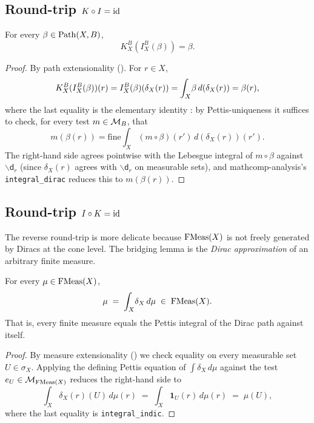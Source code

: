 \subsection{Round-trip \texorpdfstring{$K \circ I = \id$}{K . I = id}}\label{sec:KI-roundtrip}

\begin{theorem}[Round-trip $K \circ I = \id$ at the path level]%
\label{thm:KI}\rocqok\mathcompok
{}%
For every $\beta \in \mathrm{Path}(X, B)$,
\[
  K^B_X(I^B_X(\beta)) = \beta.
\]
\end{theorem}
\begin{proof}
By path extensionality
(). For $r \in X$,
\[
  K^B_X(I^B_X(\beta))(r)
   = I^B_X(\beta)(\delta_X(r))
   = \int_{X}\!\beta\,d(\delta_X(r))
   = \beta(r),
\]
where the last equality is the elementary identity
: by
Pettis-uniqueness it suffices to check, for every test $m \in
\mathcal{M}_B$, that
\[
  m(\beta(r))
    = \mathrm{fine}\!\int_X (m \circ \beta)(r')\,d(\delta_X(r))(r').
\]
The right-hand side agrees pointwise with the Lebesgue integral of
$m \circ \beta$ against $\backslash\mathsf{d}_r$ (since $\delta_X(r)$
agrees with $\backslash\mathsf{d}_r$ on measurable sets), and
mathcomp-analysis's \texttt{integral\_dirac} reduces this to
$m(\beta(r))$.
\end{proof}

\subsection{Round-trip \texorpdfstring{$I \circ K = \mathrm{id}$}{I . K = id}}\label{sec:IK-roundtrip}

The reverse round-trip is more delicate because $\mathrm{FMeas}(X)$ is not
freely generated by Diracs at the cone level. The bridging lemma is
the \emph{Dirac approximation} of an arbitrary finite measure.

\begin{lemma}%
\label{lem:dirac-approx}\rocqok\mathcompok
{}%
For every $\mu \in \mathrm{FMeas}(X)$,
\[
  \mu \;=\; \int_{X}\!\delta_X\,d\mu \;\in\; \mathrm{FMeas}(X).
\]
That is, every finite measure equals the Pettis integral of the
Dirac path against itself.
\end{lemma}
\begin{proof}
By measure extensionality () we
check equality on every measurable set $U \in \sigma_X$. Applying the
defining Pettis equation of $\int \delta_X\,d\mu$ against the test
$e_U \in \mathcal{M}_{\mathrm{FMeas}(X)}$ reduces the right-hand side to
\[
  \int_X \delta_X(r)(U)\,d\mu(r) \;=\; \int_X \mathbf{1}_U(r)\,d\mu(r) \;=\;
  \mu(U),
\]
where the last equality is \texttt{integral\_indic}.
\end{proof}

